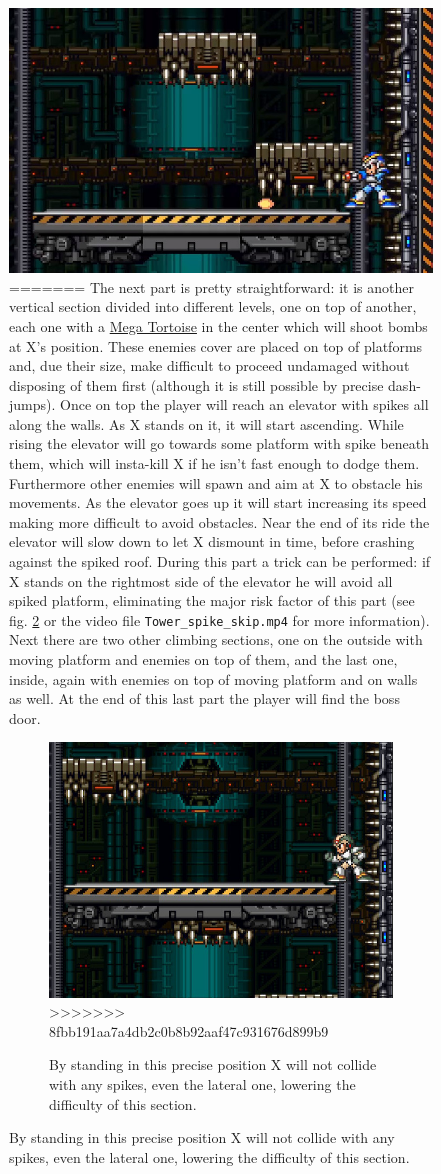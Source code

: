 \begin{figure}[htp]
	\centering
	\includegraphics[width=0.5\linewidth]{figures/X1/Boomer_kuwanger/Tower_spike_skip.jpg}
=======
The next part is pretty straightforward: it is another vertical section divided into different levels, one on top of another, each one with a \hyperlink{enem:Mega_Tortoise}{Mega Tortoise} in the center which will shoot bombs at X's position. These enemies cover are placed on top of platforms and, due their size, make difficult to proceed undamaged without disposing of them first (although it is still possible by precise dash-jumps). Once on top the player will reach an elevator with spikes all along the walls. As X stands on it, it will start ascending. While rising the elevator will go towards some platform with spike beneath them, which will insta-kill X if he isn't fast enough to dodge them. Furthermore other enemies will spawn and aim at X to obstacle his movements. As the elevator goes up it will start increasing its speed making more difficult to avoid obstacles. Near the end of its ride the elevator will slow down to let X dismount in time, before crashing against the spiked roof. During this part a trick can be performed: if X stands on the rightmost side of the elevator he will avoid all spiked platform, eliminating the major risk factor of this part (see fig. \ref{tower_spike} or the video file \texttt{Tower\_spike\_skip.mp4} for more information). Next there are two other climbing sections, one on the outside with moving platform and enemies on top of them, and the last one, inside, again with enemies on top of moving platform and on walls as well. At the end of this last part the player will find the boss door.
\begin{figure}[htp]
	\centering
	\includegraphics[width=0.5\linewidth]{figures/X1/Tower_spike_skip.jpg}
>>>>>>> 8fbb191aa7a4db2c0b8b92aaf47c931676d899b9
	\caption{By standing in this precise position X will not collide with any spikes, even the lateral one, lowering the difficulty of this section.}
	\label{tower_spike}
\end{figure}


\end{figure}
